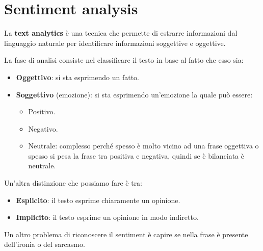 \section{Sentiment analysis}
\begin{definizione}
      La \textbf{text analytics} è una tecnica che permette di estrarre informazioni
      dal linguaggio naturale per identificare informazioni soggettive e oggettive.
\end{definizione}
La fase di analisi consiste nel classificare il testo in base al fatto che esso
sia:
\begin{itemize}
      \item \textbf{Oggettivo}: si sta esprimendo un fatto.
      \item \textbf{Soggettivo} (emozione): si sta esprimendo un'emozione la quale
            può essere:
            \begin{itemize}
                  \item Positivo.
                  \item Negativo.
                  \item Neutrale: complesso perché spesso è molto vicino ad una
                        frase oggettiva o spesso si pesa la frase tra positiva e
                        negativa, quindi se è bilanciata è neutrale.
            \end{itemize}
\end{itemize}
Un'altra distinzione che possiamo fare è tra:
\begin{itemize}
      \item \textbf{Esplicito}: il testo esprime chiaramente un opinione.
      \item \textbf{Implicito}: il testo esprime un opinione in modo indiretto.
\end{itemize}
Un altro problema di riconoscere il sentiment è capire se nella frase è
presente dell'ironia o del sarcasmo.
